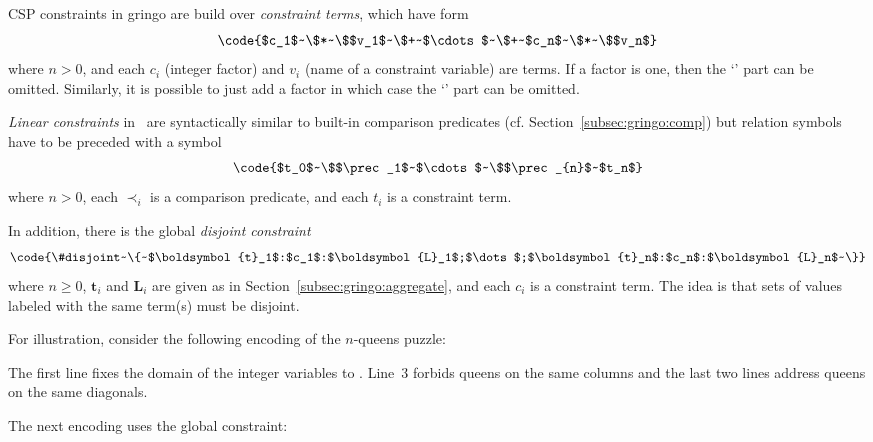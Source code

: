 CSP constraints in gringo are build over \emph{constraint terms}, which have form
\[\code{$c_1$~\$*~\$$v_1$~\$+~$\cdots$~\$+~$c_n$~\$*~\$$v_n$}\]
where $n>0$, and each $c_i$ (integer factor) and $v_i$ (name of a constraint variable) are terms.
If a factor is one, then the `' part can be omitted.
Similarly, it is possible to just add a factor in which case the `' part can be omitted.

\emph{Linear constraints} in \gringo\ are syntactically similar to built-in comparison predicates (cf. Section~\ref{subsec:gringo:comp})
but relation symbols have to be preceded with a \code{\$} symbol
\[\code{$t_0$~\$$\prec_1$~$\cdots$~\$$\prec_{n}$~$t_n$}\]
where $n>0$, each $\prec_i$ is a comparison predicate, and each $t_i$ is a constraint term.

In addition, there is the global \emph{disjoint constraint}
\[\code{\#disjoint~\{~$\boldsymbol{t}_1$:$c_1$:$\boldsymbol{L}_1$;$\dots$;$\boldsymbol{t}_n$:$c_n$:$\boldsymbol{L}_n$~\}}\]
where $n\geq 0$, $\boldsymbol{t}_i$ and $\boldsymbol{L}_i$ are given as in Section~\ref{subsec:gringo:aggregate},
and each $c_i$ is a constraint term.
%
The idea is that sets of values labeled with the same term(s) must be disjoint.

\begin{example}\label{ex:csp:queens1}
For illustration,
consider the following encoding of the $n$-queens puzzle:


The first line fixes the domain of the integer variables
 to .
Line~3 forbids queens on the same columns and the last two lines address queens on the same diagonals.
\end{example}

\begin{example}
The next encoding uses the global  constraint:
%
%

\end{example}

